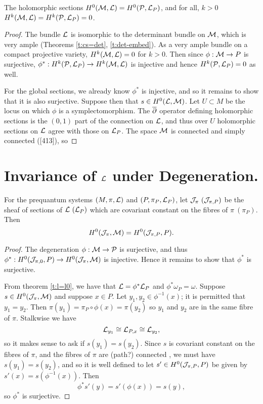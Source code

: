 	\begin{theorem}
		The holomorphic sections $H^0(\mathcal{M},\mathcal{L}) = H^0(\mathcal{P}, \mathcal{L}_P)$, and for all, $k>0$ $H^k(\mathcal{M},\mathcal{L}) = H^k(\mathcal{P},\mathcal{L}_P) = 0$.
	\end{theorem}
	\begin{proof}
		The bundle $\mathcal{L}$ is isomorphic to the determinant bundle on $\mathcal{M}$, which is very ample (Theorems \ref{t:cs=det}, \ref{t:det-embed}). As a very ample bundle on a compact projective variety, $H^k(\mathcal{M},\mathcal{L}) = 0$ for $k>0$. Then since $\phi:\mathcal{M}\to P$ is surjective, $\phi^\ast:H^k(\mathcal{P},\mathcal{L}_P)\to H^k(\mathcal{M},\mathcal{L})$ is injective and hence $H^k(\mathcal{P},\mathcal{L}_P) =0$ as well.
		
		For the global sections, we already know $\phi^\ast$ is injective, and so it remains to show that it is also surjective. Suppose then that $s\in H^0(\mathcal{L},\mathcal{M})$. Let $U \subset M$ be the locus on which $\phi$ is a symplectomorphism. The $\overline{\partial}$ operator defining holomorphic sections is the $(0,1)$ part of the connection on $\mathcal{L}$, and thus over $U$ holomorphic sections on $\mathcal{L}$ agree with those on $\mathcal{L}_P$. The space $\mathcal{M}$ is connected and simply connected ([413]\cite{ramadas_comments_1989}), so 
	\end{proof}

\section{Invariance of $\mathcal{L}$ under Degeneration.}
	\begin{theorem}
		For the prequantum systems $(M,\pi,\mathcal{L})$ and $(P,\pi_{P}, \mathcal{L}_P)$, let $\mathcal{J}_\pi ~(\mathcal{J}_{\pi,P})$ be the sheaf of sections of $\mathcal{L} ~(\mathcal{L}_P)$ which are covariant constant on the fibres of $\pi ~(\pi_P)$. Then
		\begin{equation}
			H^0(\mathcal{J}_\pi, \mathcal{M}) = H^0(\mathcal{J}_{\pi,P}, P).
		\end{equation}
	\end{theorem}
	\begin{proof}
		The degeneration $\phi:\mathcal{M}\to\mathcal{P}$ is surjective, and thus $\phi^\ast:H^0(\mathcal{J}_{\pi,0},P) \to H^0(\mathcal{J}_\pi,\mathcal{M})$ is injective. Hence it remains to show that $\phi^\ast$ is surjective.
		\smallskip
		
		From theorem \ref{t:l=l0}, we have that $\mathcal{L}=\phi^\ast \mathcal{L}_P$ and $\phi^\ast \omega_P = \omega$. Suppose $s\in H^0(\mathcal{J}_{\pi},\mathcal{M})$ and suppose $x \in P$. Let $y_1,y_2 \in \phi^{-1}(x)$; it is permitted that $y_1=y_2$. Then $\pi(y_1) = \pi_P\circ \phi(x) = \pi(y_2)$ so $y_1$ and $y_2$ are in the same fibre of $\pi$. Stalkwise we have
		\begin{equation}
			\mathcal{L}_{y_1} \cong \mathcal{L}_{P,x} \cong \mathcal{L}_{y_2},
		\end{equation} 
		so it makes sense to ask if $s(y_1) = s(y_2)$. Since $s$ is covariant constant on the fibres of $\pi$, and the fibres of $\pi$ are (path?) connected \cite[thm 2.5]{jeffrey_bohr-sommerfeld_1992}, we must have $s(y_1)=s(y_2)$, and so it is well defined to let $s'\in H^0(\mathcal{J}_{\pi,P},P)$ be given by $s'(x) = s\left(\phi^{-1}(x)\right)$. Then
		\begin{equation}
			\phi^\ast s'(y) = s'(\phi(x)) = s(y),
		\end{equation}
		so $\phi^\ast$ is surjective.
		\end{proof}

